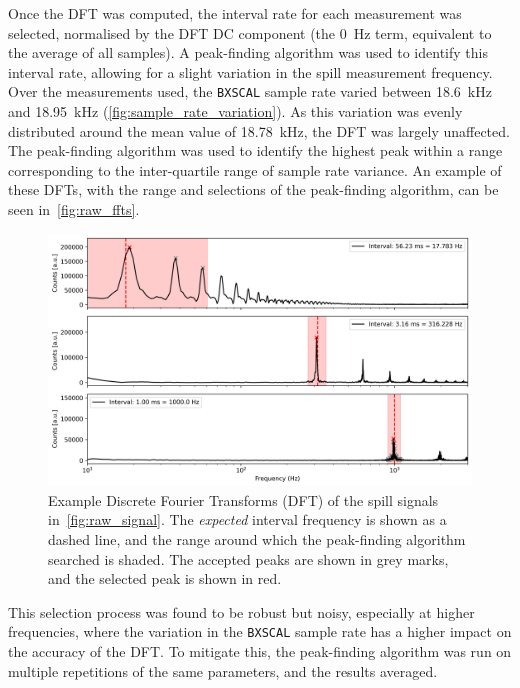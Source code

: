 \documentclass[11pt]{report}
\begin{document}
Once the DFT was computed, the interval rate for each measurement was selected, normalised by the DFT DC component (the \qty{0}{\hertz} term, equivalent to the average of all samples). A peak-finding algorithm was used to identify this interval rate, allowing for a slight variation in the spill measurement frequency. Over the measurements used, the \verb|BXSCAL| sample rate varied between \qty{18.6}{\kilo\hertz} and \qty{18.95}{\kilo\hertz} (\autoref{fig:sample_rate_variation}). As this variation was evenly distributed around the mean value of \qty{18.78}{\kilo\hertz}, the DFT was largely unaffected. The peak-finding algorithm was used to identify the highest peak within a range corresponding to the inter-quartile range of sample rate variance. An example of these DFTs, with the range and selections of the peak-finding algorithm, can be seen in~\autoref{fig:raw_ffts}.

\begin{figure}
  \centering
  \includegraphics*[width=0.8\linewidth]{raw_ffts.png}
  \caption{Example Discrete Fourier Transforms (DFT) of the spill signals in~\autoref{fig:raw_signal}. The \textit{expected} interval frequency is shown as a dashed line, and the range around which the peak-finding algorithm searched is shaded. The accepted peaks are shown in grey marks, and the selected peak is shown in red.}\label{fig:raw_ffts}
\end{figure}

This selection process was found to be robust but noisy, especially at higher frequencies, where the variation in the \verb|BXSCAL| sample rate has a higher impact on the accuracy of the DFT. To mitigate this, the peak-finding algorithm was run on multiple repetitions of the same parameters, and the results averaged.
\end{document}
